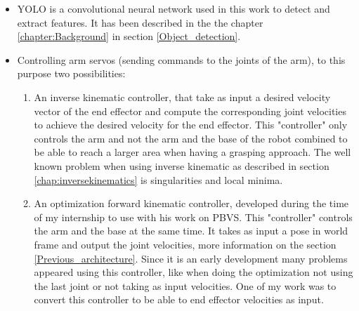 \begin{itemize}
    \item 
\gls{YOLO} is a convolutional neural network used in this work to detect and extract features. It has been described in the the chapter \ref{chapter:Background} in section \ref{Object_detection}.
    \item 
Controlling arm servos (sending commands to the joints of the arm), to this purpose two possibilities:
    \begin{enumerate}
        \item  An inverse kinematic controller, that take as input a desired velocity vector of the end effector and compute the corresponding joint velocities to achieve the desired velocity for the end effector. This "controller" only controls the arm and not the arm and the base of the robot combined to be able to reach a larger area when having a grasping approach. The well known problem when using inverse kinematic as described in section \ref{chap:inversekinematics} is singularities and local minima.
        \item An optimization forward kinematic controller, developed during the time of my internship to use with his work on \gls{PBVS}. This "controller" controls the arm and the base at the same time. It takes as input a pose in world frame and output the joint velocities, more information on the section \ref{Previous_architecture}. Since it is an early development many problems appeared using this controller, like when doing the optimization not using the last joint or not taking as input velocities. One of my work was to convert this controller to be able to end effector velocities as input.
    \end{enumerate}

\end{itemize}

